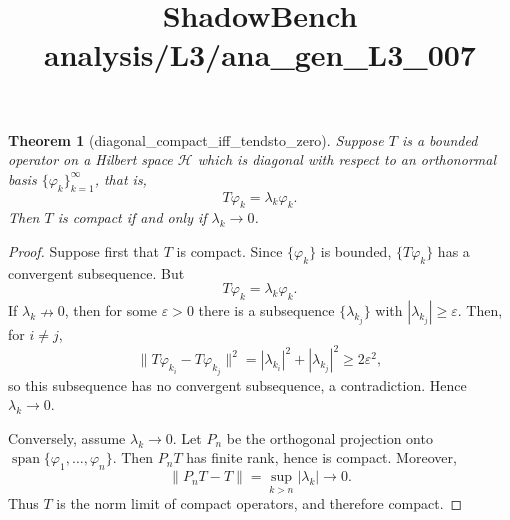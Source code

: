 \documentclass{article}
\title{ShadowBench analysis/L3/ana\_gen\_L3\_007}
\newtheorem{theorem}{Theorem}
\begin{document}
\maketitle

\begin{theorem}[diagonal_compact_iff_tendsto_zero]
Suppose $T$ is a bounded operator on a Hilbert space $\mathcal{H}$ which is diagonal with respect to an orthonormal basis $\{\varphi_k\}_{k=1}^{\infty}$, that is,
\[
T\varphi_k = \lambda_k \varphi_k .
\]
Then $T$ is compact if and only if $\lambda_k \to 0$.
\end{theorem}

\begin{proof}
Suppose first that $T$ is compact. Since $\{\varphi_k\}$ is bounded, 
$\{T\varphi_k\}$ has a convergent subsequence. But
\[
T\varphi_k=\lambda_k\varphi_k.
\]
If $\lambda_k\nrightarrow 0$, then for some $\varepsilon>0$ there is a subsequence
$\{\lambda_{k_j}\}$ with $|\lambda_{k_j}|\ge \varepsilon$. Then, for $i\ne j$,
\[
\|T\varphi_{k_i}-T\varphi_{k_j}\|^2
=
|\lambda_{k_i}|^2+|\lambda_{k_j}|^2
\ge 2\varepsilon^2,
\]
so this subsequence has no convergent subsequence, a contradiction. Hence
$\lambda_k\to 0$.

Conversely, assume $\lambda_k\to 0$. Let $P_n$ be the orthogonal projection onto
$\operatorname{span}\{\varphi_1,\dots,\varphi_n\}$. Then $P_nT$ has finite rank, hence is compact. Moreover,
\[
\|P_nT-T\|
=
\sup_{k>n}|\lambda_k|
\to 0.
\]
Thus $T$ is the norm limit of compact operators, and therefore compact.
\end{proof}
\end{document}
